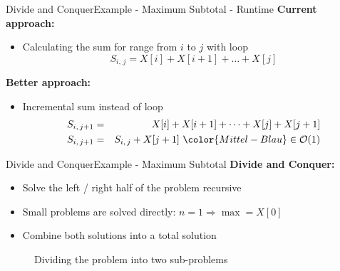 
\begin{frame}{Divide and Conquer}{Example - Maximum Subtotal - Runtime}
  \textbf{Current approach:}
  \begin{itemize}
    \item
      Calculating the sum for range from $i$ to $j$ with loop
      \begin{displaymath}
        S_{i,\,j} = X[i] + X[i+1] + \dots + X[j]
      \end{displaymath}
   \end{itemize}
   \textbf{Better approach:}
   \begin{itemize}
    \item
      Incremental sum instead of loop
      \begin{eqnarray*}
        S_{i,\,j+1} &=& X[i] + X[i+1] + \dots + X[j] + X[j+1]\\
        S_{i,\,j+1} &=& S_{i,\,j} + X[j+1]
        ~{\color{Mittel-Blau}\in \mathcal{O}(1)}
      \end{eqnarray*}
  \end{itemize}
\end{frame}





\begin{frame}{Divide and Conquer}{Example - Maximum Subtotal}
  \textbf{Divide and Conquer:}
  \begin{itemize}
    \item
      Solve the left / right half of the problem {\color{Mittel-Blau}recursive}
    \item
      Small problems are solved directly: $n = 1 \Rightarrow \max = X[0]$
    \item
      Combine both solutions into a total solution
  \end{itemize}
  \begin{figure}
    \begin{adjustbox}{width=\linewidth}
      
    \end{adjustbox}
    \caption{Dividing the problem into two sub-problems}
    \label{fig:divide_and_conquer:max_sub_total_divide}
  \end{figure}
\end{frame}

